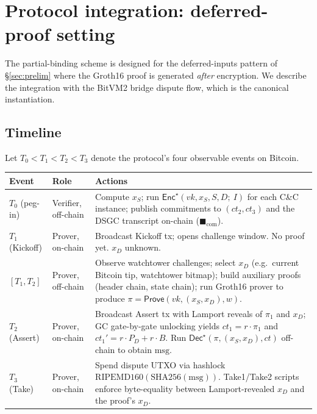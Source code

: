 \documentclass[11pt]{article}
\newcommand{\msg}{\mathrm{msg}}
\newcommand{\Enc}{\mathsf{Enc}}
\newcommand{\Dec}{\mathsf{Dec}}
\begin{document}
\section{Protocol integration: deferred-proof setting}\label{sec:protocol}

The partial-binding scheme is designed for the deferred-inputs
pattern of \S\ref{sec:prelim} where the Groth16 proof is generated
\emph{after} encryption. We describe the integration with the BitVM2
bridge dispute flow, which is the canonical instantiation.

\subsection{Timeline}

Let $T_0 < T_1 < T_2 < T_3$ denote the protocol's four observable
events on Bitcoin.

\begin{center}\small
\renewcommand{\arraystretch}{1.25}
\begin{tabular}{@{}l p{4.0cm} p{7.2cm}@{}}
\toprule
\textbf{Event} & \textbf{Role} & \textbf{Actions} \\
\midrule
$T_0$ (peg-in) & Verifier, off-chain & Compute $x_S$; run
$\Enc^\star(vk, x_S, S, D;\ I)$ for each C\&C instance; publish
commitments to $(ct_2, ct_3)$ and the DSGC transcript on-chain
($\blacksquare_{\mathrm{com}}$). \\
$T_1$ (Kickoff) & Prover, on-chain & Broadcast Kickoff tx; opens
challenge window. No proof yet. $x_D$ unknown. \\
$[T_1, T_2]$ & Prover, off-chain & Observe watchtower challenges;
select $x_D$ (e.g.\ current Bitcoin tip, watchtower bitmap); build
auxiliary proofs (header chain, state chain); run Groth16 prover to
produce $\pi = \mathsf{Prove}(vk, (x_S, x_D), w)$. \\
$T_2$ (Assert) & Prover, on-chain & Broadcast Assert tx with Lamport
reveals of $\pi_1$ and $x_D$; GC gate-by-gate unlocking yields
$ct_1 = r \cdot \pi_1$ and
$ct_1' = r \cdot P_D + r \cdot B$. Run
$\Dec^\star(\pi, (x_S, x_D), ct)$
off-chain to obtain $\msg$. \\
$T_3$ (Take) & Prover, on-chain & Spend dispute UTXO via hashlock
$\mathrm{RIPEMD160}(\mathrm{SHA256}(\msg))$. Take1/Take2 scripts
enforce byte-equality between Lamport-revealed $x_D$ and the proof's
$x_D$. \\
\bottomrule
\end{tabular}
\end{center}
\end{document}
